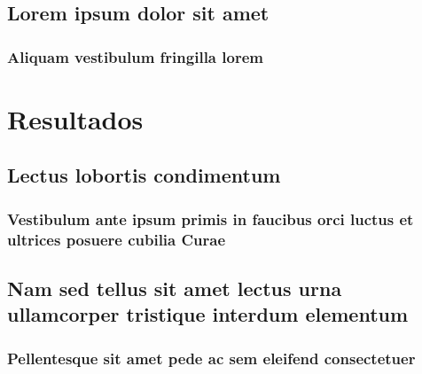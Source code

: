 \documentclass[
    12pt,               %
    openright,          %
    twoside,            %
    a4paper,            %
    brazil              %
    ]{abntex2}
\begin{document}
\chapter{Lorem ipsum dolor sit amet}

\section{Aliquam vestibulum fringilla lorem}

\lipsum[1]

\lipsum[2-3]

\part{Resultados}

\chapter{Lectus lobortis condimentum}

\section{Vestibulum ante ipsum primis in faucibus orci luctus et ultrices
posuere cubilia Curae}

\lipsum[21-22]

\chapter{Nam sed tellus sit amet lectus urna ullamcorper tristique interdum
elementum}

\section{Pellentesque sit amet pede ac sem eleifend consectetuer}

\lipsum[24]

\end{document}
